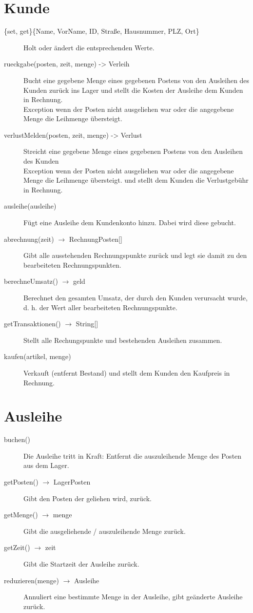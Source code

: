 \documentclass[a4paper,12pt,titlepage]{article}
\begin{document}
\section{Kunde}
\begin{description}
\item[\{set, get\}\{Name, VorName, ID, Straße, Hausnummer, PLZ, Ort\}]
Holt oder ändert die entsprechenden Werte.
\item[rueckgabe(posten, zeit, menge) -> Verleih]
Bucht eine gegebene Menge eines gegebenen Postens von den Ausleihen des Kunden zurück ins Lager
und stellt die Kosten der Ausleihe dem Kunden in Rechnung.\\
Exception wenn der Posten nicht ausgeliehen war oder die angegebene Menge die Leihmenge übersteigt.
\item[verlustMelden(posten, zeit, menge) -> Verlust]
Streicht eine gegebene Menge eines gegebenen Postens von den Ausleihen des Kunden\\
Exception wenn der Posten nicht ausgeliehen war oder die angegebene Menge die Leihmenge übersteigt.
und stellt dem Kunden die Verlustgebühr in Rechnung.
\item[ausleihe(ausleihe)]
Fügt eine Ausleihe dem Kundenkonto hinzu. Dabei wird diese gebucht.
\item[abrechnung(zeit) $\rightarrow$ RechnungPosten{[]}]
Gibt alle ausstehenden Rechnungspunkte zurück und legt sie damit zu den bearbeiteten Rechnungspunkten.
\item[berechneUmsatz() $\rightarrow$ geld]
Berechnet den gesamten Umsatz, der durch den Kunden verursacht wurde, d. h. der Wert aller bearbeiteten Rechnungspunkte.
\item[getTransaktionen() $\rightarrow$ String{[]}]
Stellt alle Rechungspunkte und bestehenden Ausleihen zusammen.
\item[kaufen(artikel, menge)]
Verkauft (entfernt Bestand) und stellt dem Kunden den Kaufpreis in Rechnung.
\end{description}
\section{Ausleihe}
\begin{description}
\item[buchen()]
Die Ausleihe tritt in Kraft: Entfernt die auszuleihende Menge des Posten aus dem Lager.
\item[getPosten() $\rightarrow$ LagerPosten]
Gibt den Posten der geliehen wird, zurück.
\item[getMenge() $\rightarrow$ menge]
Gibt die ausgeliehende / auszuleihende Menge zurück.
\item[getZeit() $\rightarrow$ zeit]
Gibt die Startzeit der Ausleihe zurück.
\item[reduzieren(menge) $\rightarrow$ Ausleihe]
Annuliert eine bestimmte Menge in der Ausleihe, gibt geänderte Ausleihe zurück.
\end{description}
\end{document}
